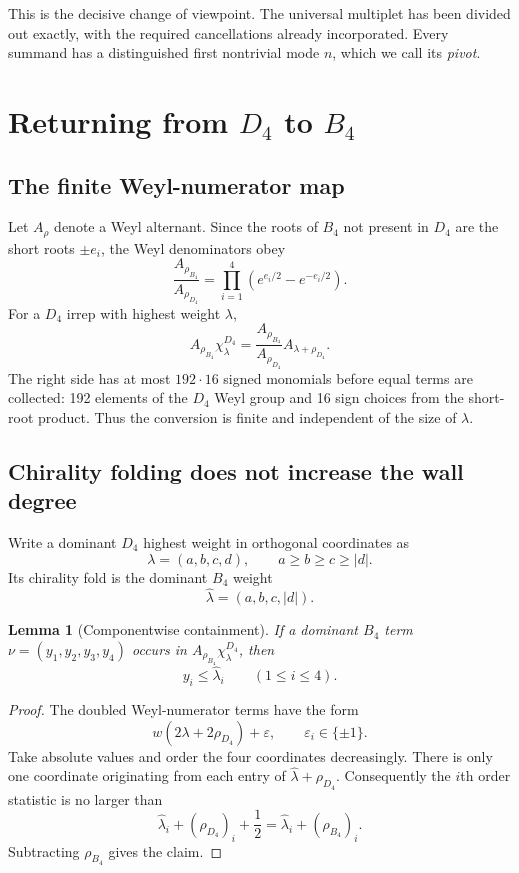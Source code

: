 \documentclass[11pt,a4paper]{article}
\newtheorem{lemma}[theorem]{Lemma}
\theoremstyle{definition}
\begin{document}
This is the decisive change of viewpoint.  The universal multiplet has been
divided out exactly, with the required cancellations already incorporated.
Every summand has a distinguished first nontrivial mode $n$, which we call
its \emph{pivot}.

\section{Returning from $D_4$ to $B_4$}

\subsection{The finite Weyl-numerator map}

Let $A_\rho$ denote a Weyl alternant.  Since the roots of $B_4$ not present
in $D_4$ are the short roots $\pm e_i$, the Weyl denominators obey
\[
   \frac{A_{\rho_{B_4}}}{A_{\rho_{D_4}}}
   =\prod_{i=1}^{4}\left(e^{e_i/2}-e^{-e_i/2}\right).
\]
For a $D_4$ irrep with highest weight $\lambda$,
\[
 A_{\rho_{B_4}}\chi^{D_4}_{\lambda}
 =\frac{A_{\rho_{B_4}}}{A_{\rho_{D_4}}}
  A_{\lambda+\rho_{D_4}}.
\]
The right side has at most $192\cdot16$ signed monomials before equal terms
are collected: 192 elements of the $D_4$ Weyl group and 16 sign choices from
the short-root product.  Thus the conversion is finite and independent of
the size of $\lambda$.

\subsection{Chirality folding does not increase the wall degree}

Write a dominant $D_4$ highest weight in orthogonal coordinates as
\[
   \lambda=(a,b,c,d),
   \qquad a\geq b\geq c\geq|d|.
\]
Its chirality fold is the dominant $B_4$ weight
\[
   \widehat\lambda=(a,b,c,|d|).
\]

\begin{lemma}[Componentwise containment]
If a dominant $B_4$ term
$\nu=(y_1,y_2,y_3,y_4)$ occurs in
$A_{\rho_{B_4}}\chi^{D_4}_\lambda$, then
\[
   y_i\leq\widehat\lambda_i
   \qquad (1\leq i\leq4).
\]
\end{lemma}

\begin{proof}
The doubled Weyl-numerator terms have the form
\[
   w(2\lambda+2\rho_{D_4})+\varepsilon,
   \qquad \varepsilon_i\in\{\pm1\}.
\]
Take absolute values and order the four coordinates decreasingly.  There is
only one coordinate originating from each entry of
$\widehat\lambda+\rho_{D_4}$.  Consequently the $i$th order statistic is no
larger than
\[
   \widehat\lambda_i+(\rho_{D_4})_i+\frac12
   =\widehat\lambda_i+(\rho_{B_4})_i.
\]
Subtracting $\rho_{B_4}$ gives the claim.
\end{proof}
\end{document}
